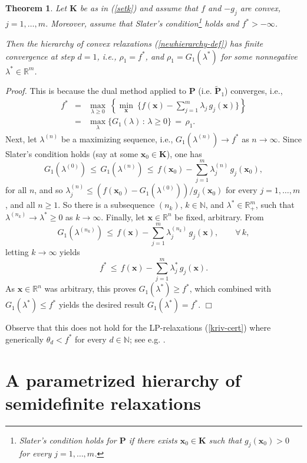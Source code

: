 \documentclass[11pt]{article}
\newtheorem{theorem}{Theorem}[section]
\numberwithin{equation}{section}
\def\x{\mathbf{x}}
\def\R{\mathbb{R}}
\def\N{\mathbb{N}}
\def\K{\mathbf{K}}
\def\P{\mathbf{P}}
\begin{document}
\begin{theorem}
\label{new-convex-case}
Let $\K$ be as in (\ref{setk})  and assume that $f$ and $-g_j$ are convex, $j=1,\ldots,m$. 
Moreover, assume that Slater's condition\footnote{Slater's condition holds for $\P$ if there exists $\x_0\in\K$ such that
$g_j(\x_0)>0$ for every $j=1,\ldots,m$.} holds and $f^*>-\infty$.

Then the hierarchy of convex relaxations (\ref{newhierarchy-def}) has finite convergence at step $d=1$, i.e., $\rho_1=f^*$,
and $\rho_1=G_1(\lambda^*)$ for some nonnegative $\lambda^*\in\R^m$.
\end{theorem}
{\it Proof.}
This is because the dual method applied to $\P$ (i.e. $\tilde{\P}_1$) converges, i.e.,
\begin{eqnarray*}
f^*&=&\max_{\lambda\geq0}\:\left\{\min_\x\:\{f(\x)-\sum_{j=1}^m\lambda_j\,g_j(\x)\}\right\}\\
&=&\max_\lambda\{G_1(\lambda)\,:\,\lambda\geq0\}\,=\,\rho_1.\end{eqnarray*}
Next, 
let $\lambda^{(n)}$ be a maximizing sequence, i.e., $G_1(\lambda^{(n)})\to f^*$ as $n\to\infty$.
Since Slater's condition holds (say at some $\x_0\in\K$), one has
\[G_1(\lambda^{(0)})\,\leq\,G_1(\lambda^{(n)})\,\leq\,f(\x_0)-\sum_{j=1}^m\lambda^{(n)}_j\,g_j(\x_0),\]
for all $n$, and so $\lambda^{(n)}_j\leq (f(\x_0)-G_1(\lambda^{(0)}))/g_j(\x_0)$ for every $j=1,\ldots,m$, and all $n\geq1$. So 
there is a subsequence $(n_k)$, $k\in\N$, 
and $\lambda^*\in\R^m_+$, such that $\lambda^{(n_k)}\to\lambda^*\geq0$ as $k\to\infty$.
Finally, let $\x\in\R^n$ be fixed, arbitrary.
From
\[G_1(\lambda^{(n_k)})\,\leq\,f(\x)-\sum_{j=1}^m\lambda^{(n_k)}_j\,g_j(\x),\qquad\forall\,k,\]
letting $k\to\infty$ yields
\[f^*\,\leq\,f(\x)-\sum_{j=1}^m\lambda^*_j\,g_j(\x).\]
As $\x\in\R^n$ was arbitrary, this proves $G_1(\lambda^*)\geq f^*$, which combined with
$G_1(\lambda^*)\leq f^*$ yields
the desired result $G_1(\lambda^*)=f^*$.
$\Box$
\vspace{0.2cm}

Observe that this does not hold for the LP-relaxations (\ref{kriv-cert}) where generically
$\theta_d<f^*$ for every $d\in\N$; see e.g. \cite{Lasserre02a,lasserre-imperial}.

\section{A parametrized hierarchy of\\ semidefinite relaxations}
\end{document}
